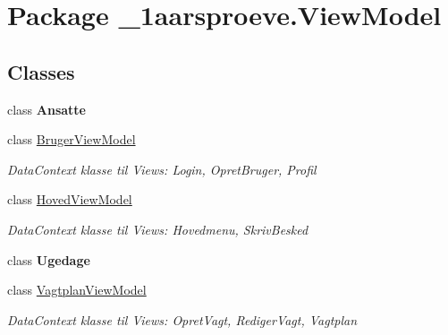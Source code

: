 \hypertarget{namespace__1aarsproeve_1_1_view_model}{}\section{Package \+\_\+1aarsproeve.\+View\+Model}
\label{namespace__1aarsproeve_1_1_view_model}
\subsection*{Classes}
\begin{DoxyCompactItemize}
\item 
class {\bfseries Ansatte}
\item 
class \hyperlink{class__1aarsproeve_1_1_view_model_1_1_bruger_view_model}{Bruger\+View\+Model}
\begin{DoxyCompactList}\small\item\em Data\+Context klasse til Views\+: Login, Opret\+Bruger, Profil \end{DoxyCompactList}\item 
class \hyperlink{class__1aarsproeve_1_1_view_model_1_1_hoved_view_model}{Hoved\+View\+Model}
\begin{DoxyCompactList}\small\item\em Data\+Context klasse til Views\+: Hovedmenu, Skriv\+Besked \end{DoxyCompactList}\item 
class {\bfseries Ugedage}
\item 
class \hyperlink{class__1aarsproeve_1_1_view_model_1_1_vagtplan_view_model}{Vagtplan\+View\+Model}
\begin{DoxyCompactList}\small\item\em Data\+Context klasse til Views\+: Opret\+Vagt, Rediger\+Vagt, Vagtplan \end{DoxyCompactList}\end{DoxyCompactItemize}
